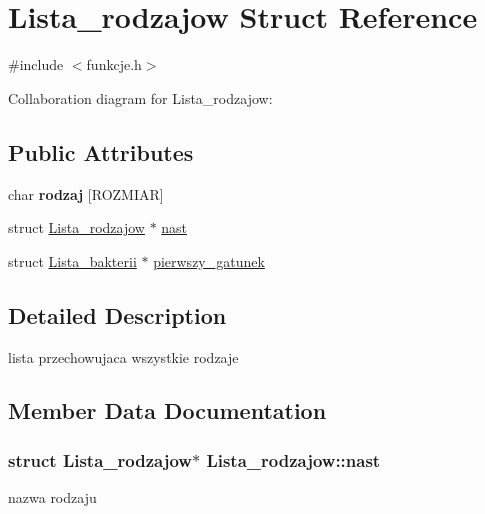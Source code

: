\hypertarget{structLista__rodzajow}{}\section{Lista\+\_\+rodzajow Struct Reference}
\label{structLista__rodzajow}


{\ttfamily \#include $<$funkcje.\+h$>$}



Collaboration diagram for Lista\+\_\+rodzajow\+:
\subsection*{Public Attributes}
\begin{DoxyCompactItemize}
\item 
char {\bfseries rodzaj} \mbox{[}R\+O\+Z\+M\+I\+AR\mbox{]}\hypertarget{structLista__rodzajow_ad13317d5a7e479368e60a948cda5ab58}{}\label{structLista__rodzajow_ad13317d5a7e479368e60a948cda5ab58}

\item 
struct \hyperlink{structLista__rodzajow}{Lista\+\_\+rodzajow} $\ast$ \hyperlink{structLista__rodzajow_a87d31863ae81faf0677711264f7ff153}{nast}
\item 
struct \hyperlink{structLista__bakterii}{Lista\+\_\+bakterii} $\ast$ \hyperlink{structLista__rodzajow_ad5224c57306a452beed54d774fd959af}{pierwszy\+\_\+gatunek}
\end{DoxyCompactItemize}


\subsection{Detailed Description}
lista przechowujaca wszystkie rodzaje 

\subsection{Member Data Documentation}
\subsubsection[{\texorpdfstring{nast}{nast}}]{\setlength{\rightskip}{0pt plus 5cm}struct {\bf Lista\+\_\+rodzajow}$\ast$ Lista\+\_\+rodzajow\+::nast}\hypertarget{structLista__rodzajow_a87d31863ae81faf0677711264f7ff153}{}\label{structLista__rodzajow_a87d31863ae81faf0677711264f7ff153}
nazwa rodzaju 
